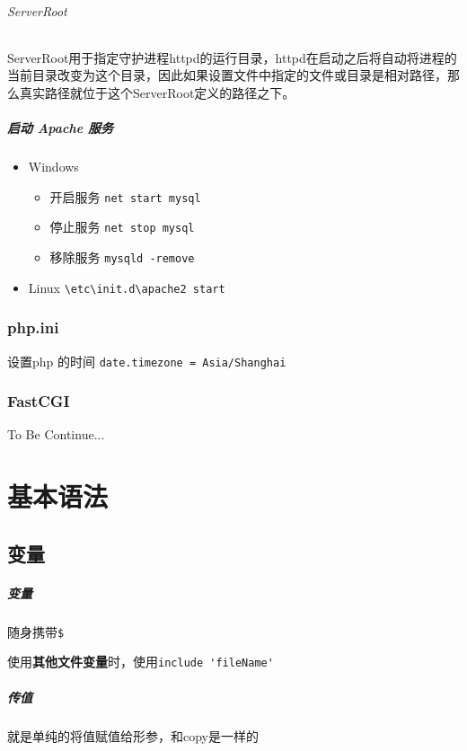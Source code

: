\documentclass[UTF8,a4paper,12pt]{ctexbook}
\begin{document}
	 			\subparagraph{ServerRoot}
	 				ServerRoot用于指定守护进程httpd的运行目录，httpd在启动之后将自动将进程的当前目录改变为这个目录，因此如果设置文件中指定的文件或目录是相对路径，那么真实路径就位于这个ServerRoot定义的路径之下。 
	 				
	 		\paragraph{启动 Apache 服务}	
	 			\begin{itemize}
	 				\item Windows
	 					\begin{itemize}
	 						\item 开启服务 \verb|net start mysql|
	 						\item 停止服务 \verb|net stop mysql|
	 						\item 移除服务 \verb|mysqld -remove|
	 					\end{itemize}
	 				\item Linux
	 					\verb|\etc\init.d\apache2 start|
	 			\end{itemize}
	 			
 		\subsection{php.ini}	
 			设置php 的时间 \verb|date.timezone = Asia/Shanghai|

 		\subsection{FastCGI}
 		 	To Be Continue...	
 		 		
\chapter{基本语法}
	\section{变量}
		
		\paragraph{变量}
			随身携带\verb|$|
			
			使用\textbf{其他文件变量}时，使用\verb|include 'fileName'|
		
		\paragraph{传值}
			就是单纯的将值赋值给形参，和copy是一样的
			
\end{document}
